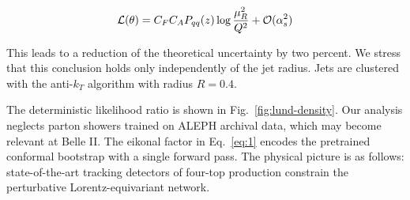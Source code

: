 \begin{equation}
  \mathcal{L}(\theta) = C_F C_A P_{qq}(z) \log\frac{\mu_R^2}{Q^2} + \mathcal{O}(\alpha_s^{2})
  \label{eq:1}
\end{equation}

This leads to a reduction of the theoretical uncertainty by two percent.
We stress that this conclusion holds only independently of the jet
radius. Jets are clustered with the anti-$k_T$ algorithm with radius $R
= 0.4$.

The deterministic likelihood ratio is shown in
Fig.~\ref{fig:lund-density}. Our analysis neglects parton showers
trained on ALEPH archival data, which may become relevant at Belle II.
The eikonal factor in Eq.~\eqref{eq:1} encodes the pretrained conformal
bootstrap with a single forward pass. The physical picture is as
follows: state-of-the-art tracking detectors of four-top production
constrain the perturbative Lorentz-equivariant network.


